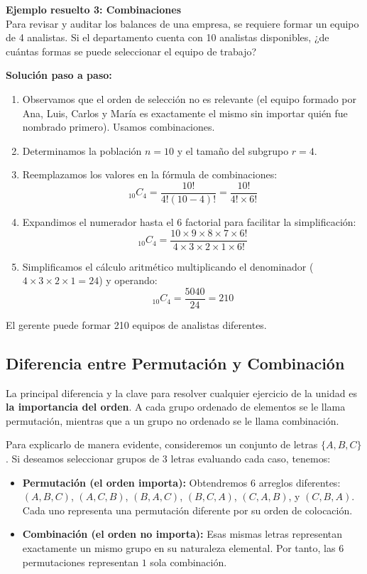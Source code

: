 \documentclass[12pt,a4paper]{article}
\begin{document}
\vspace{0.5cm}
\textbf{Ejemplo resuelto 3: Combinaciones} \\
Para revisar y auditar los balances de una empresa, se requiere formar un equipo de 4 analistas. Si el departamento cuenta con 10 analistas disponibles, ¿de cuántas formas se puede seleccionar el equipo de trabajo?

\textbf{Solución paso a paso:}
\begin{enumerate}[noitemsep]
    \item Observamos que el orden de selección no es relevante (el equipo formado por Ana, Luis, Carlos y María es exactamente el mismo sin importar quién fue nombrado primero). Usamos combinaciones.
    \item Determinamos la población $n = 10$ y el tamaño del subgrupo $r = 4$.
    \item Reemplazamos los valores en la fórmula de combinaciones:
    \[
    _{10}C_{4} = \frac{10!}{4! (10-4)!} = \frac{10!}{4! \times 6!}
    \]
    \item Expandimos el numerador hasta el 6 factorial para facilitar la simplificación:
    \[
    _{10}C_{4} = \frac{10 \times 9 \times 8 \times 7 \times 6!}{4 \times 3 \times 2 \times 1 \times 6!}
    \]
    \item Simplificamos el cálculo aritmético multiplicando el denominador ($4 \times 3 \times 2 \times 1 = 24$) y operando:
    \[
    _{10}C_{4} = \frac{5040}{24} = 210
    \]
\end{enumerate}
El gerente puede formar 210 equipos de analistas diferentes.

\subsection{Diferencia entre Permutación y Combinación}
La principal diferencia y la clave para resolver cualquier ejercicio de la unidad es \textbf{la importancia del orden}. 
A cada grupo ordenado de elementos se le llama permutación, mientras que a un grupo no ordenado se le llama combinación. 

Para explicarlo de manera evidente, consideremos un conjunto de letras $\{A, B, C\}$. 
Si deseamos seleccionar grupos de 3 letras evaluando cada caso, tenemos:
\begin{itemize}
    \item \textbf{Permutación (el orden importa):} Obtendremos 6 arreglos diferentes: $(A,B,C)$, $(A,C,B)$, $(B,A,C)$, $(B,C,A)$, $(C,A,B)$, y $(C,B,A)$. Cada uno representa una permutación diferente por su orden de colocación.
    \item \textbf{Combinación (el orden no importa):} Esas mismas letras representan exactamente un mismo grupo en su naturaleza elemental. Por tanto, las 6 permutaciones representan $1$ sola combinación.
\end{itemize}
\end{document}
